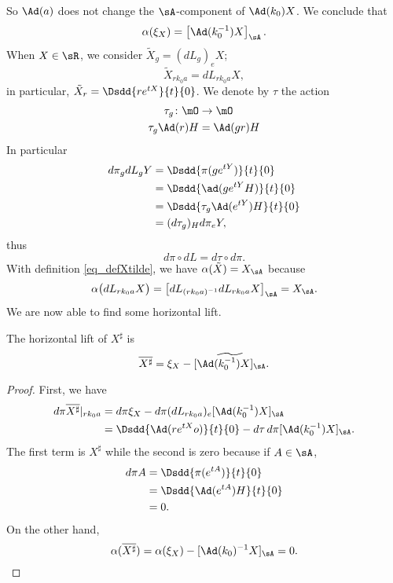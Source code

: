 So $\Ad(a)$ does not change the $\sA$-component of $\Ad(k_0)X$. We conclude that
\begin{equation}
  \alpha(\xi_X)=\left[ \Ad(k_0^{-1})X \right]_{\sA}.
\end{equation}
When $X\in\sR$, we consider $\tilde X_g=(dL_g)_eX$;
\begin{equation}                         \label{eq_defXtilde}
  \tilde X_{rk_0a}=dL_{rk_0a}X,
\end{equation}
in particular, $\tilde X_r=\Dsdd{ r e^{tX} }{t}{0}$.
We denote by $\tau$ the action
\begin{equation}
\begin{aligned}
 \tau_g\colon\mO&\to \mO \\ 
\tau_g\Ad(r)H&= \Ad(gr)H 
\end{aligned}
\end{equation}
In particular
\[ 
 \begin{split}
d\pi_gdL_g Y&=\Dsdd{ \pi(g e^{tY}) }{t}{0}\\
        &=\Dsdd{ \ad(g e^{tY}H) }{t}{0}\\
        &=\Dsdd{ \tau_g\Ad( e^{tY})H }{t}{0}\\
        &=(d\tau_g)_Hd\pi_e Y,
\end{split} 
\]
thus
\begin{equation}
d\pi\circ dL = d\tau\circ d\pi.
\end{equation}
With definition \eqref{eq_defXtilde}, we have $\alpha(\tilde X)=X_{\sA}$ because
 \[ 
\alpha\big( dL_{rk_0a}X \big)=\left[ dL_{(rk_0a)^{-1}}dL_{rk_0a}X \right]_{\sA}
        =X_{\sA}.
\]
We are now able to find some horizontal lift. 
\begin{proposition}  \label{prop_horliftXdiz}
The horizontal lift of $X^{\sharp}$ is
\[
  \overline{ X^{\sharp} }=\xi_X-\widetilde{  [\Ad(k_0^{-1})X]_{\sA}  }.
\]

\end{proposition}

\begin{proof}
First, we have
\[ 
 \begin{split}
d\pi\overline{ X^{\sharp} }|_{rk_0a}&=d\pi\xi_X-d\pi(dL_{rk_0a})_e[\Ad(k_0^{-1})X]_{\sA}\\
                &=\Dsdd{ \Ad(r e^{tX}o) }{t}{0}-d\tau\,d\pi[\Ad(k_0^{-1})X]_{\sA}.
\end{split} 
\]
The first term is $X^{\sharp}$ while the second is zero because if $A\in\sA$, 
\[ 
 \begin{split}
d\pi A&=\Dsdd{ \pi( e^{tA}) }{t}{0}\\
        &=\Dsdd{ \Ad( e^{tA})H }{t}{0}\\
        &=0.
\end{split} 
\]
On the other hand,
\[ 
\alpha(\overline{ X^{\sharp} })=\alpha(\xi_X)-[\Ad(k_0)^{-1}X]_{\sA}=0.
\]
\end{proof}

